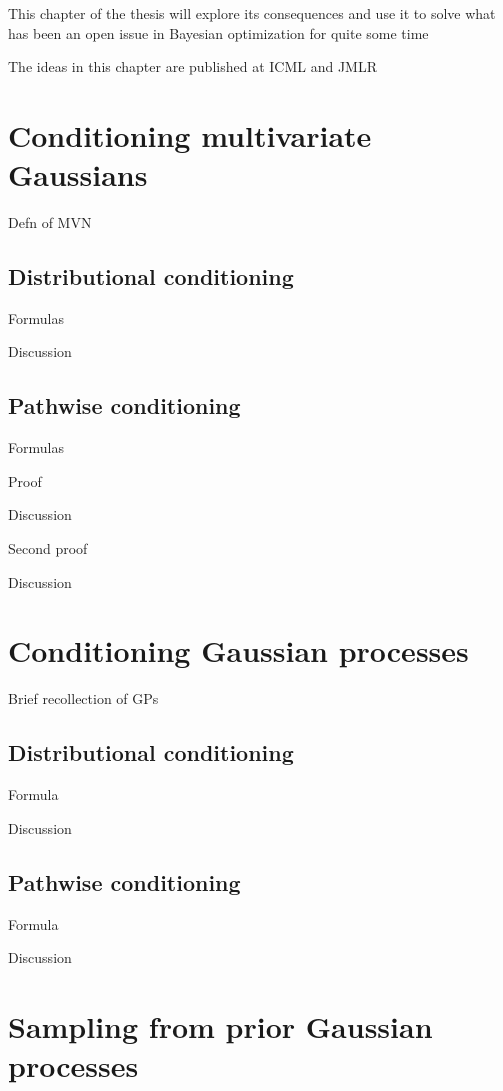 \documentclass[11pt]{book}
\begin{document}
This chapter of the thesis will explore its consequences and use it to solve what has been an open issue in Bayesian optimization for quite some time

The ideas in this chapter are published at ICML and JMLR

\section{Conditioning multivariate Gaussians}

Defn of MVN

\subsection{Distributional conditioning}

Formulas

Discussion

\subsection{Pathwise conditioning}

Formulas

Proof

Discussion

Second proof

Discussion

\section{Conditioning Gaussian processes}

Brief recollection of GPs 

\subsection{Distributional conditioning}

Formula

Discussion

\subsection{Pathwise conditioning}

Formula

Discussion

\section{Sampling from prior Gaussian processes}
\end{document}
